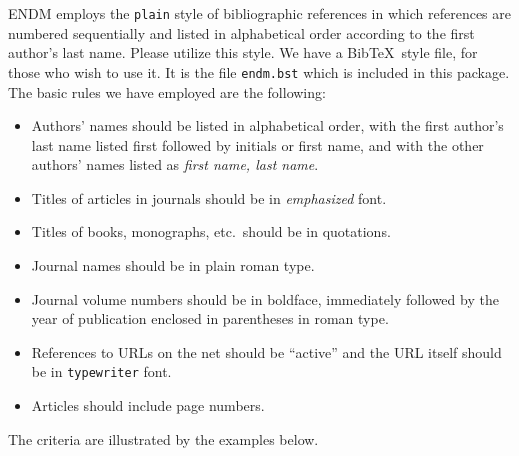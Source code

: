 \documentclass{endm}
\begin{document}
ENDM employs the \texttt{plain} style of bibliographic references in
which references are numbered sequentially and listed in alphabetical
order according to the first author's last name. Please utilize this
style. We have a Bib\TeX\ style file, for those who wish to use it.
It is the file \texttt{endm.bst} which is included in this package.
The basic rules we have employed are the following:
\begin{itemize}
\item Authors' names should be listed in alphabetical order, with the
first author's last name listed first followed by initials or first
name, and with the other authors' names listed as \emph{first name,
last name}.
\item Titles of articles in journals should be in \emph{emphasized}
font.
\item Titles of books, monographs, etc.\ should be in quotations.
\item Journal names should be in plain roman type.
\item Journal volume numbers should be in boldface, immediately
followed by the year of publication enclosed in parentheses in
roman type.
\item References to URLs on the net should be ``active'' and the URL
itself should be in {\tt typewriter} font.
\item Articles should include page numbers.
\end{itemize}

The criteria are illustrated by the examples below.
\end{document}
